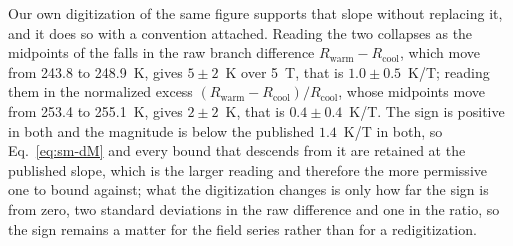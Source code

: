\documentclass[reprint,twocolumn,prb,amsmath,amssymb,superscriptaddress,floatfix]{revtex4-2}
\begin{document}
Our own digitization of the same figure supports that slope without replacing it, and it does so
with a convention attached. Reading the two collapses as the midpoints of the falls in the raw
branch difference $R_{\mathrm{warm}}-R_{\mathrm{cool}}$, which move from 243.8 to 248.9~K, gives
$5\pm2$~K over 5~T, that is $1.0\pm0.5$~K/T; reading them in the normalized excess
$(R_{\mathrm{warm}}-R_{\mathrm{cool}})/R_{\mathrm{cool}}$, whose midpoints move from 253.4 to
255.1~K, gives $2\pm2$~K, that is $0.4\pm0.4$~K/T. The sign is positive in both and the
magnitude is below the published $1.4$~K/T in both, so Eq.~\eqref{eq:sm-dM} and every bound that
descends from it are retained at the published slope, which is the larger reading and therefore
the more permissive one to bound against; what the digitization changes is only how far the sign
is from zero, two standard deviations in the raw difference and one in the ratio, so the sign
remains a matter for the field series rather than for a redigitization.
\end{document}
